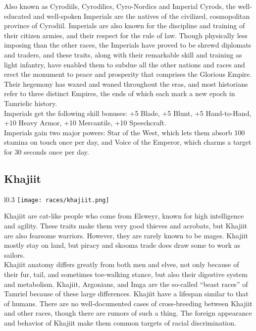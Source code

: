 Also known as Cyrodiils, Cyrodilics, Cyro-Nordics and Imperial Cyrods, the well-educated and well-spoken Imperials are the natives of the civilized, cosmopolitan province of Cyrodiil. Imperials are also known for the discipline and training of their citizen armies, and their respect for the rule of law. Though physically less imposing than the other races, the Imperials have proved to be shrewd diplomats and traders, and these traits, along with their remarkable skill and training as light infantry, have enabled them to subdue all the other nations and races and erect the monument to peace and prosperity that comprises the Glorious Empire. Their hegemony has waxed and waned throughout the eras, and most historians refer to three distinct Empires, the ends of which each mark a new epoch in Tamrielic history.\\

Imperials get the following skill bonuses: +5 Blade, +5 Blunt, +5 Hand-to-Hand, +10 Heavy Armor, +10 Mercantile, +10 Speechcraft.\\

Imperials gain two major powers: Star of the West, which lets them absorb 100 stamina on touch once per day, and Voice of the Emperor, which charms a target for 30 seconds once per day.

\subsection{Khajiit}
\begin{wrapfigure}{l}{0.3\textwidth}
	\texttt{[image: races/khajiit.png]}
\end{wrapfigure}

Khajiit are cat-like people who come from Elsweyr, known for high intelligence and agility. These traits make them very good thieves and acrobats, but Khajiit are also fearsome warriors. However, they are rarely known to be mages. Khajiit mostly stay on land, but piracy and skooma trade does draw some to work as sailors.\\

Khajiit anatomy differs greatly from both men and elves, not only because of their fur, tail, and sometimes toe-walking stance, but also their digestive system and metabolism. Khajiit, Argonians, and Imga are the so-called ``beast races'' of Tamriel because of these large differences. Khajiit have a lifespan similar to that of humans. There are no well-documented cases of cross-breeding between Khajiit and other races, though there are rumors of such a thing. The foreign appearance and behavior of Khajiit make them common targets of racial discrimination.\\

